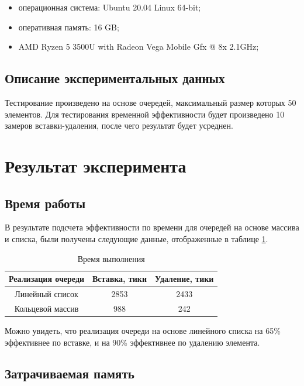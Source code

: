 \begin{itemize}[$\bullet$]
	\item операционная система: Ubuntu 20.04 Linux 64-bit;
	\item оперативная память: 16 GB;
	\item AMD Ryzen 5 3500U with Radeon Vega Mobile Gfx @ 8x 2.1GHz;
\end{itemize}

\subsection{Описание экспериментальных данных}

Тестирование произведено на основе очередей, максимальный размер которых 50 элементов. Для тестирования временной эффективности будет произведено 10 замеров вставки-удаления, после чего результат будет усреднен.

\section{Результат эксперимента}

\subsection{Время работы}

В результате подсчета эффективности по времени для очередей на основе массива и списка, были получены следующие данные, отображенные в таблице \ref{tab:t}.

\begin{table}
	\caption{Время выполнения}
	\label{tab:t}
	\begin{center}
		\begin{tabular}{|c|c|c|}
			\hline
			Реализация очереди & Вставка, тики & Удаление, тики \\
			\hline
			Линейный список & 2853 & 2433 \\
			\hline
 			Кольцевой массив & 988 & 242 \\
 			\hline
		\end{tabular}
	\end{center}
\end{table}

Можно увидеть, что реализация очереди на основе линейного списка на 65\% эффективнее по вставке, и на 90\% эффективнее по удалению элемента.

\subsection{Затрачиваемая память}

